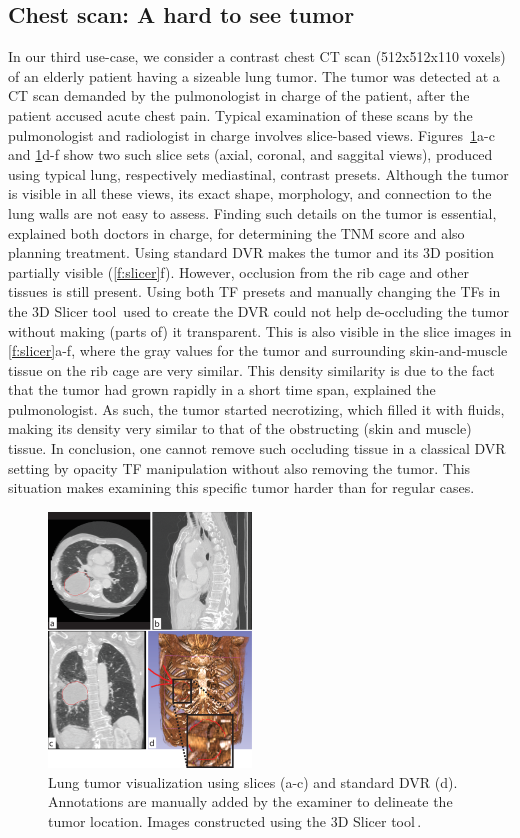 \subsection{Chest scan: A hard to see tumor}
\label{sec:chest}
%
In our third use-case, we consider a contrast chest CT scan (512x512x110 voxels) of an elderly patient having a sizeable lung tumor. The tumor was detected at a CT scan demanded by the pulmonologist in charge of the patient, after the patient accused acute chest pain. Typical examination of these scans by the pulmonologist and radiologist in charge involves slice-based views. Figures~\ref{f:slicer}a-c and \ref{f:slicer}d-f show two such slice sets (axial, coronal, and saggital views), produced using typical lung, respectively mediastinal, contrast presets. Although the tumor is visible in all these views, its exact shape, morphology, and connection to the lung walls are not easy to assess. Finding such details on the tumor is essential, explained both doctors in charge, for determining the TNM score and also planning treatment. Using standard DVR makes the tumor and its 3D position partially visible (\autoref{f:slicer}f). However, occlusion from the rib cage and other tissues is still present. Using both TF presets and manually changing the TFs in the 3D Slicer tool\,\cite{slicer} used to create the DVR could not help de-occluding the tumor without making (parts of) it transparent. This is also visible in the slice images in \autoref{f:slicer}a-f, where the gray values for the tumor and surrounding skin-and-muscle tissue on the rib cage are very similar. 
This density similarity is due to the fact that the tumor had grown rapidly in a short time span, explained the pulmonologist. As such, the tumor started necrotizing, which filled it with fluids, making its density very similar to that of the obstructing (skin and muscle) tissue. In conclusion, one cannot remove such occluding tissue in a classical DVR setting by opacity TF manipulation without also removing the tumor. This situation makes examining this specific tumor harder than for regular cases.

\begin{figure}[htb]
\includegraphics [width=0.48\textwidth]{images/slicer.eps}
\caption{Lung tumor visualization using slices (a-c) and standard DVR (d). Annotations are manually added by the examiner to delineate the tumor location. Images constructed using the 3D Slicer tool\,\cite{slicer}.}
\label{f:slicer}
\end{figure}

